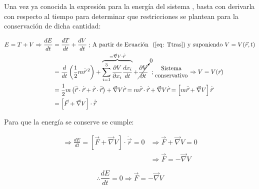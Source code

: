 \documentclass[/home/hernan/Documentos/Apuntes_mecanica_teorica/main.tex]{subfiles}
\begin{document}
	\begin{theorem}
		Una vez ya conocida la expresión para la energía del sistema , basta con derivarla con respecto al tiempo para determinar que restricciones se plantean para la conservación de dicha cantidad:

		\begin{align*}
			E = T + V \Rightarrow \frac{dE}{dt} & = \frac{dT}{dt} + \frac{dV}{dt} \; \textup{; A partir de \Eqref{eq: Ttras} y suponiendo $V = V(\vec{r}, t)$}\\
												& = \frac{d}{dt} \left(\frac{1}{2} m \dot{\vec{r}}\:^{2}\right) + \overbrace{\sum_{i=1}^{3} \frac{\partial V}{\partial x_{i}} \frac{d x_{i}}{d t}}^{= \vec{\nabla}V \cdot \dot{\vec{r}}} + \cancelto{0}{\frac{\partial V}{\partial t}} \; \; ; \left .\begin{matrix}
													\textup{Sistema}\\ 
													\textup{conservativo}
													\end{matrix} \right . \Rightarrow V = V(\vec{r}) \\
												& = \frac{1}{2} m \left(\ddot{\vec{r}} \cdot \dot{\vec{r}} + \dot{\vec{r}} \cdot \ddot{\vec{r}}\right) + \vec{\nabla} V \dot{\vec{r}} 
												= m \ddot{\vec{r}} \cdot \dot{\vec{r}} + \vec{\nabla} V \dot{\vec{r}}
												= \left[m \ddot{\vec{r}} +   \vec{\nabla} V \right] \dot{\vec{r}}\\
												& = \left[\vec{F} + \vec{\nabla} V \right] \cdot \dot{\vec{r}}\\
		\end{align*}

		Para que la energía se conserve se cumple:

		\begin{align*}
			\Rightarrow \frac{dE}{dt} = \left[\vec{F} + \vec{\nabla} V \right] \cdot \dot{\vec{r}} = 0
			&\Rightarrow \vec{F} + \vec{\nabla} V = 0\\
			& \Rightarrow \vec{F} = - \vec{\nabla} V 
		\end{align*}

		\begin{equation}
			\therefore \frac{dE}{dt} = 0 \Rightarrow  \vec{F} = - \vec{\nabla} V
			\label{eq: Econs}
		\end{equation}
		
	\end{theorem}
\end{document}
